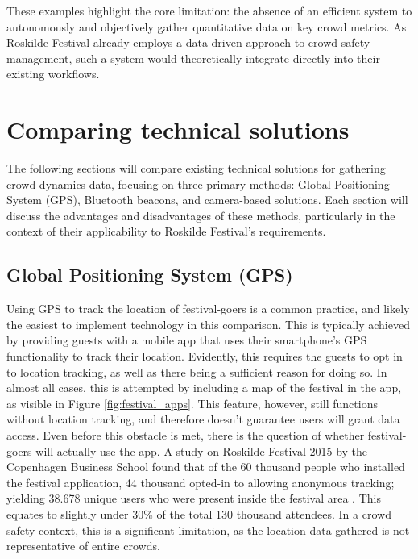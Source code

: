 These examples highlight the core limitation: the absence of an efficient system to autonomously and objectively gather quantitative data on key crowd metrics. As Roskilde Festival already employs a data-driven approach to crowd safety management, such a system would theoretically integrate directly into their existing workflows.

\section{Comparing technical solutions}
\label{sec:technical-solutions}

The following sections will compare existing technical solutions for gathering crowd dynamics data, focusing on three primary methods: Global Positioning System (GPS), Bluetooth beacons, and camera-based solutions. Each section will discuss the advantages and disadvantages of these methods, particularly in the context of their applicability to Roskilde Festival's requirements.

\subsection{Global Positioning System (GPS)}
\label{sec:gps}

Using GPS to track the location of festival-goers is a common practice, and likely the easiest to implement technology in this comparison. This is typically achieved by providing guests with a mobile app that uses their smartphone's GPS functionality to track their location. Evidently, this requires the guests to opt in to location tracking, as well as there being a sufficient reason for doing so. In almost all cases, this is attempted by including a map of the festival in the app, as visible in Figure \ref{fig:festival_apps}. This feature, however, still functions without location tracking, and therefore doesn't guarantee users will grant data access. Even before this obstacle is met, there is the question of whether festival-goers will actually use the app. A study on Roskilde Festival 2015 by the Copenhagen Business School  found that of the 60 thousand people who installed the festival application, 44 thousand opted-in to allowing anonymous tracking; yielding 38.678 unique users who were present inside the festival area \cite{rf_app}. This equates to slightly under 30\% of the total 130 thousand attendees. In a crowd safety context, this is a significant limitation, as the location data gathered is not representative of entire crowds.

